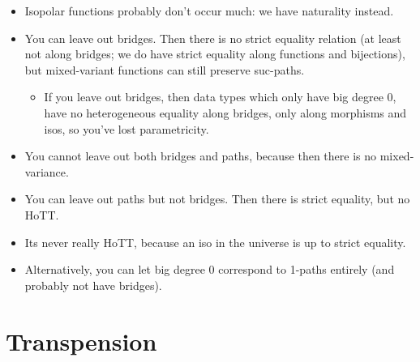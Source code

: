 \documentclass[a4paper]{memoir}
\begin{document}
{\begin{itemize}
	This is an argument to have both bridges and paths.
	\item Isopolar functions probably don't occur much: we have naturality instead.
	\item You can leave out bridges. Then there is no strict equality relation (at least not along bridges; we do have strict equality along functions and bijections), but mixed-variant functions can still preserve suc-paths.
	\begin{itemize}
		\item If you leave out bridges, then data types which only have big degree 0, have no heterogeneous equality along bridges, only along morphisms and isos, so you've lost parametricity.
	\end{itemize}
	\item You cannot leave out both bridges and paths, because then there is no mixed-variance.
	\item You can leave out paths but not bridges. Then there is strict equality, but no HoTT.
	\item Its never really HoTT, because an iso in the universe is up to strict equality.
	\item Alternatively, you can let big degree 0 correspond to 1-paths entirely (and probably not have bridges).
\end{itemize}
}


\chapter{Transpension}

\appendix
\end{document}
